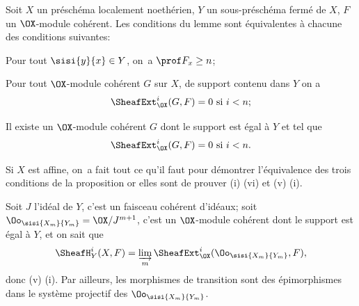 \begin{remarque} \label{III.3.2}\pageoriginale
{}
\end{remarque}

\begin{proposition} \label{III.3.3}
Soit $X$ un pr\'esch\'ema localement noeth\'erien, $Y$ un sous-pr\'esch\'ema ferm\'e de $X$, $F$ un $\OX$-module coh\'erent. Les conditions du lemme  sont \'equivalentes \`a chacune des conditions suivantes:
\begin{enumeratei}
\setcounter{enumi}{3}
\item
Pour tout $\sisi{y}{x}\in Y$, on~a $\prof F_x \geq n$;

\item
Pour tout $\OX$-module coh\'erent $G$ sur $X$, de support contenu dans $Y$ on a
\[
\SheafExt_{\OX}^i(G, F)=0 \text{ si } i<n;
\]

\item
Il existe un $\OX$-module coh\'erent $G$ dont le support est \'egal \`a $Y$ et tel que
\[
\SheafExt_{\OX}^i(G, F)=0 \text{ si } i<n.
\]
\end{enumeratei}
\end{proposition}

Si $X$ est affine, on~a fait tout ce qu'il faut  pour d\'emontrer l'\'equivalence des trois conditions de la proposition \sisi{, }{;} or elles sont  de prouver (i) \ALORS (vi) et (v) \ALORS (i).

Soit $J$ l'id\'eal de $Y$, c'est un faisceau coh\'erent d'id\'eaux; soit $\Oo_{\sisi{X_m}{Y_m}} = \OX/J^{m+1}$, c'est un $\OX$-module coh\'erent dont le support est \'egal \`a $Y$, et on sait  que
\[
\SheafH_Y^i(X, F) = \varinjlim_m \SheafExt_{\OX}^i(\Oo_{\sisi{X_m}{Y_m}}, F),
\]
donc (v) \ALORS (i). Par ailleurs\pageoriginale, les morphismes de transition sont des \'epimorphismes dans le syst\`eme projectif des $\Oo_{\sisi{X_m}{Y_m}}$.

